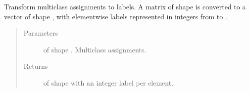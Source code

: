 \documentclass[letterpaper,10pt,english]{sphinxmanual}
\begin{document}
\begin{fulllineitems}
\label{\detokenize{pusion.util.transformer:pusion.util.transformer.multiclass_assignments_to_labels}}
\sphinxAtStartPar
Transform multiclass assignments to labels. A matrix of shape  is converted to a vector
of shape , with element\sphinxhyphen{}wise labels represented in integers from  to .
\begin{quote}\begin{description}
\item[{Parameters}] \leavevmode
\sphinxAtStartPar
{} \textendash{}  of shape . Multiclass assignments.

\item[{Returns}] \leavevmode
\sphinxAtStartPar
{} of shape  with an integer label per element.

\end{description}\end{quote}

\end{fulllineitems}

\end{document}
